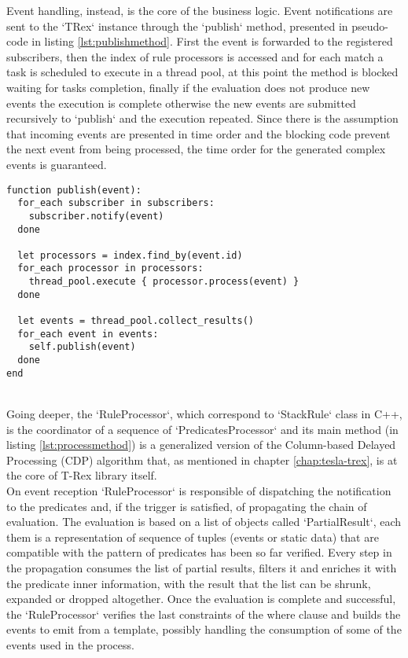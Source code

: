 Event handling, instead, is the core of the business logic. Event notifications are sent to the `TRex` instance through the `publish` method, presented in pseudo-code in listing \ref{lst:publishmethod}. First the event is forwarded to the registered subscribers, then the index of rule processors is accessed and for each match a task is scheduled to execute in a thread pool, at this point the method is blocked waiting for tasks completion, finally if the evaluation does not produce new events the execution is complete otherwise the new events are submitted recursively to `publish` and the execution repeated. Since there is the assumption that incoming events are presented in time order and the blocking code prevent the next event from being processed, the time order for the generated complex events is guaranteed.\\
\begin{minipage}{\textwidth}
\begin{lstlisting}[caption={TRex publish method},label={lst:publishmethod},xleftmargin=.05\textwidth]
function publish(event):
  for_each subscriber in subscribers:
    subscriber.notify(event)
  done
  
  let processors = index.find_by(event.id)
  for_each processor in processors:
    thread_pool.execute { processor.process(event) }
  done
  
  let events = thread_pool.collect_results()
  for_each event in events:
  	self.publish(event)
  done
end
\end{lstlisting}
\end{minipage}\\
Going deeper, the `RuleProcessor`, which correspond to `StackRule` class in C++, is the coordinator of a sequence of `PredicatesProcessor` and its main method (in listing \ref{lst:processmethod}) is a generalized version of the Column-based Delayed Processing (CDP) algorithm that, as mentioned in chapter \ref{chap:tesla-trex}, is at the core of T-Rex library itself.\\
On event reception `RuleProcessor` is responsible of dispatching the notification to the predicates and, if the trigger is satisfied, of propagating the chain of evaluation. The evaluation is based on a list of objects called `PartialResult`, each them is a representation of sequence of tuples (events or static data) that are compatible with the pattern of predicates has been so far verified. Every step in the propagation consumes the list of partial results, filters it and enriches it with the predicate inner information, with the result that the list can be shrunk, expanded or dropped altogether. Once the evaluation is complete and successful, the `RuleProcessor` verifies the last constraints of the where clause and builds the events to emit from a template, possibly handling the consumption of some of the events used in the process.\\
